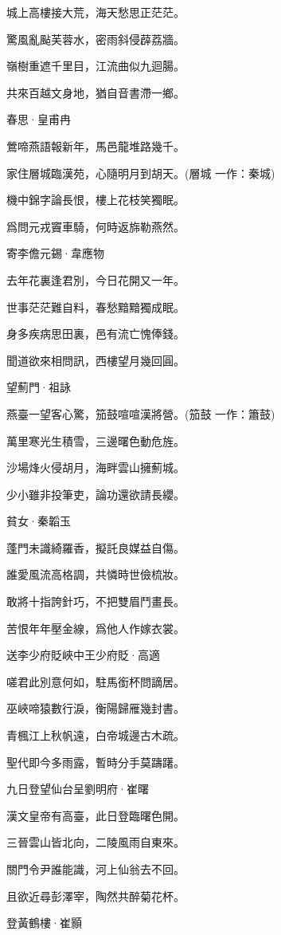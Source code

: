 \documentclass[12pt,a4paper]{ctexbook}
\begin{document}
城上高樓接大荒，海天愁思正茫茫。\par
驚風亂颭芙蓉水，密雨斜侵薜荔牆。\par
嶺樹重遮千里目，江流曲似九迴腸。\par
共來百越文身地，猶自音書滯一鄉。\par
春思·皇甫冉\par
鶯啼燕語報新年，馬邑龍堆路幾千。\par
家住層城臨漢苑，心隨明月到胡天。(層城 一作：秦城)\par
機中錦字論長恨，樓上花枝笑獨眠。\par
爲問元戎竇車騎，何時返旆勒燕然。\par
寄李儋元錫·韋應物\par
去年花裏逢君別，今日花開又一年。\par
世事茫茫難自料，春愁黯黯獨成眠。\par
身多疾病思田裏，邑有流亡愧俸錢。\par
聞道欲來相問訊，西樓望月幾回圓。\par
望薊門·祖詠\par
燕臺一望客心驚，笳鼓喧喧漢將營。(笳鼓 一作：簫鼓)\par
萬里寒光生積雪，三邊曙色動危旌。\par
沙場烽火侵胡月，海畔雲山擁薊城。\par
少小雖非投筆吏，論功還欲請長纓。\par
貧女·秦韜玉\par
蓬門未識綺羅香，擬託良媒益自傷。\par
誰愛風流高格調，共憐時世儉梳妝。\par
敢將十指誇針巧，不把雙眉鬥畫長。\par
苦恨年年壓金線，爲他人作嫁衣裳。\par
送李少府貶峽中王少府貶·高適\par
嗟君此別意何如，駐馬銜杯問謫居。\par
巫峽啼猿數行淚，衡陽歸雁幾封書。\par
青楓江上秋帆遠，白帝城邊古木疏。\par
聖代即今多雨露，暫時分手莫躊躇。\par
九日登望仙台呈劉明府·崔曙\par
漢文皇帝有高臺，此日登臨曙色開。\par
三晉雲山皆北向，二陵風雨自東來。\par
關門令尹誰能識，河上仙翁去不回。\par
且欲近尋彭澤宰，陶然共醉菊花杯。\par
登黃鶴樓·崔顥\par
\end{document}

